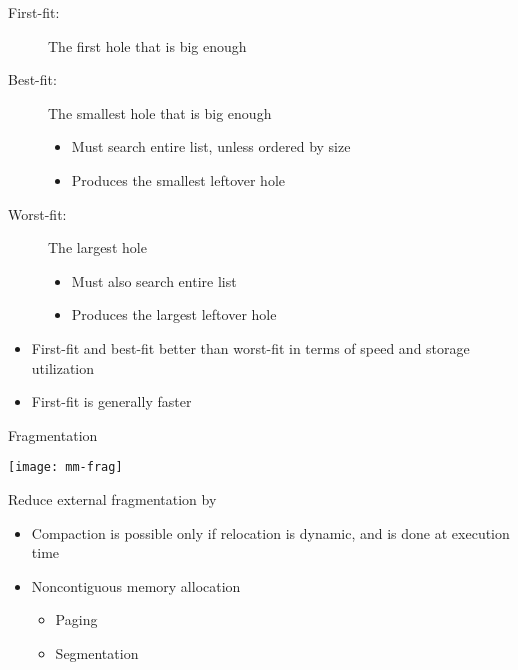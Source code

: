 \begin{frame}%
  \begin{description}
  \item[First-fit:] The first hole that is big enough
  \item[Best-fit:] The smallest hole that is big enough
    \begin{itemize}
    \item Must search entire list, unless ordered by size
    \item Produces the smallest leftover hole
    \end{itemize}
  \item[Worst-fit:] The largest hole
    \begin{itemize}
    \item Must also search entire list
    \item Produces the largest leftover hole
    \end{itemize}
  \end{description}
  \begin{itemize}
  \item First-fit and best-fit better than worst-fit in terms of speed and storage
    utilization
  \item First-fit is generally faster
  \end{itemize}
\end{frame}

\begin{frame}{Fragmentation}
  \begin{varwidth}{.3\textwidth}
    \texttt{[image: mm-frag]}
  \end{varwidth}\hfill
  \begin{varwidth}{.66\textwidth}
    \begin{block}{Reduce external fragmentation by}
      \begin{itemize}
      \item \alert{Compaction} is possible only if relocation is dynamic,
        and is done at execution time
      \item \alert{Noncontiguous memory allocation}
        \begin{itemize}
        \item Paging
        \item Segmentation
        \end{itemize}
      \end{itemize}
    \end{block}
  \end{varwidth}
\end{frame}

